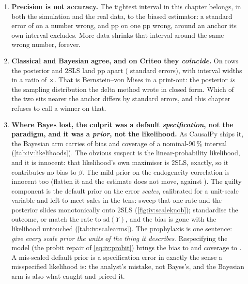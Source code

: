 \begin{enumerate}[leftmargin=*, itemsep=.45em]
  \item \textbf{Precision is not accuracy.} The tightest interval in this chapter belongs, in both
        the simulation and the real data, to the biased estimator: a standard error of
        \eur{\nbElevenNaiveSe} on a number \eur{\nbElevenNaiveErr} wrong, and \nbElevenBNaiveSe{} pp
        on one \nbElevenBNaiveErr{} pp wrong, around an anchor its own interval excludes. More
        data shrinks that interval around the same wrong number, forever.

  \item \textbf{Classical and Bayesian agree, and on Criteo they \emph{coincide}.} On
        \nbElevenBNFit{} rows the posterior and 2SLS land \nbElevenBAgreePp{} pp apart
        (\nbElevenBAgreeSes{} standard errors), with interval widths in a ratio of
        \nbElevenBWidthRatio$\times$. That is Bernstein--von Mises in a print-out: the posterior
        \emph{is} the sampling distribution the delta method wrote in closed form. Which of the two
        sits nearer the anchor differs by \nbElevenBErrGapSes{} standard errors, and this chapter
        refuses to call a winner on that.

  \item \textbf{Where Bayes lost, the culprit was a default \emph{specification}, not the paradigm,
        and it was a \emph{prior}, not the likelihood.} As CausalPy ships it, the Bayesian arm carries
        \eur{\nbElevenGaussSeedBias} of bias and \pc{\nbElevenGaussSeedCovPct} coverage of a
        nominal-90\,\% interval (\cref{tab:iv:likelihoods}). The obvious suspect is the
        linear-probability likelihood, and it is innocent: that likelihood's own maximiser is 2SLS,
        exactly, so it contributes no bias to $\beta$. The mild prior on the endogeneity correlation
        is innocent too (flatten it and the estimate does not move, \eur{\nbElevenGaussFlatMean} against
        \eur{\nbElevenGaussMean}). The guilty component is the default prior on the error
        \emph{scales}, calibrated for a unit-scale variable and left to meet sales in the tens: sweep
        that one rate and the posterior slides monotonically onto 2SLS (\cref{fig:iv:scaleknob});
        standardise the outcome, or match the rate to $\mathrm{sd}(Y)$, and the bias is gone with the
        likelihood untouched (\cref{tab:iv:scalearms}). The prophylaxis is one sentence: \emph{give
        every scale prior the units of the thing it describes}. Respecifying the model
        (the probit repair of \cref{eq:iv:probit}) brings the bias to \eur{\nbElevenSeedBias} and
        coverage to \pc{\nbElevenSeedCovPct}. A mis-scaled default prior is a specification error in
        exactly the sense a misspecified likelihood is: the analyst's mistake, not Bayes's, and the
        Bayesian arm is also what caught and priced it.


\end{enumerate}
